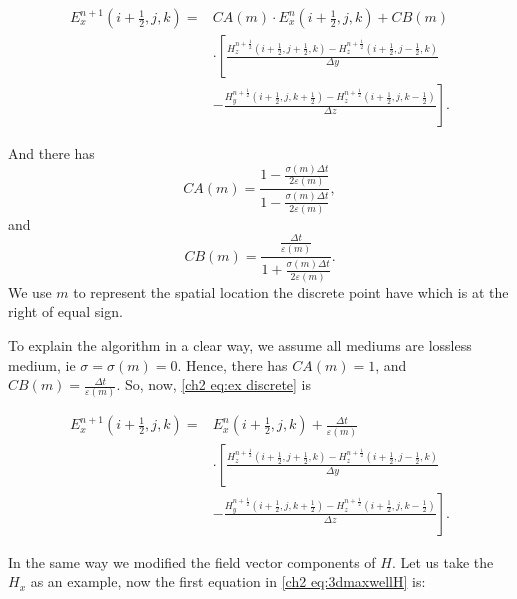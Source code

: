 \begin{equation}\label{ch2 eq:ex discrete}
\begin{split}
E^{n+1}_{x}\left( i+\frac{1}{2},j,k \right)=&CA(m) \cdot E^{n}_{x}\left( i+\frac{1}{2},j,k \right)+CB(m)\\
{}&\cdot\left[
\frac{H^{n+\frac{1}{2}}_{z}\left(i+\frac{1}{2},j+\frac{1}{2},k\right)-H^{n+\frac{1}{2}}_{z}\left(i+\frac{1}{2},j-\frac{1}{2},k\right)}{\Delta y}\right.\\
{}&-
\left.\frac{H^{n+\frac{1}{2}}_{y}\left(i+\frac{1}{2},j,k+\frac{1}{2}\right)-H^{n+\frac{1}{2}}_{z}\left(i+\frac{1}{2},j,k-\frac{1}{2}\right)}{\Delta z}
\right].
\end{split}
\end{equation}

And there has
\begin{equation}
CA(m)=\frac{
	1-\frac{\sigma(m)\Delta t}{2\varepsilon(m)}
	}{
	1-\frac{\sigma(m)\Delta t}{2\varepsilon(m)}	
	},
\end{equation}
and
\begin{equation}
CB(m)=\frac{
	\frac{\Delta t}{\varepsilon(m)}
}{
1+\frac{\sigma(m)\Delta t}{2\varepsilon(m)}	
}.
\end{equation}\label{ch2 eq:ex discrete simple}
We use $m$ to represent the spatial location the discrete point have which is at the right of equal sign. 

To explain the algorithm in a clear way, we assume all mediums are lossless medium, ie $\sigma=\sigma(m)=0$. Hence, there has $CA(m)=1$, and $CB(m)=\frac{\Delta t}{\varepsilon(m)}$. So, now, \eqref{ch2 eq:ex discrete} is

\begin{equation}
\begin{split}
E^{n+1}_{x}\left( i+\frac{1}{2},j,k \right)=&E^{n}_{x}\left( i+\frac{1}{2},j,k \right)+\frac{\Delta t}{\varepsilon(m)}\\
{}&\cdot\left[
\frac{H^{n+\frac{1}{2}}_{z}\left(i+\frac{1}{2},j+\frac{1}{2},k\right)-H^{n+\frac{1}{2}}_{z}\left(i+\frac{1}{2},j-\frac{1}{2},k\right)}{\Delta y}\right.\\
{}&-
\left.\frac{H^{n+\frac{1}{2}}_{y}\left(i+\frac{1}{2},j,k+\frac{1}{2}\right)-H^{n+\frac{1}{2}}_{z}\left(i+\frac{1}{2},j,k-\frac{1}{2}\right)}{\Delta z}
\right].
\end{split}
\end{equation}

In the same way we modified the field vector components of $\mathbf{\mathit{H}}$. Let us take the $H_x$ as an example, now the first equation in \eqref{ch2 eq:3dmaxwellH} is:

